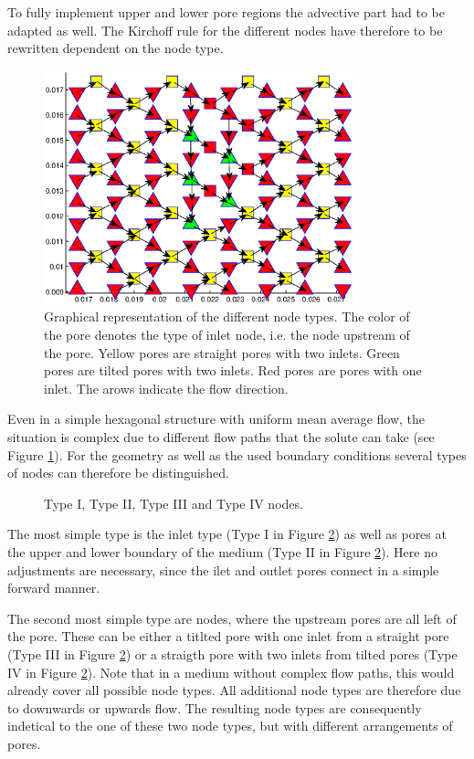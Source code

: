 \documentclass[12pt]{report}
\newcommand*{\PsTricksPath}{pstricks}
\begin{document}
To fully implement upper and lower pore regions the advective part had to be adapted as well. The Kirchoff rule for the different nodes have therefore to be rewritten dependent on the node type.

\begin{figure}[ht]
	\centering
	\includegraphics[width=0.8\textwidth]{node_types_02}
	\caption[]{Graphical representation of the different node types. The color of the pore denotes the type of inlet node, i.e. the node upstream of the pore. Yellow pores are straight pores with two inlets. Green pores are tilted pores with two inlets. Red pores are pores with one inlet. The arows indicate the flow direction.} 
	\label{fig:node_types}
\end{figure}

Even in a simple hexagonal structure with uniform mean average flow, the situation is complex due to different flow paths that the solute can take (see Figure \ref{fig:node_types}). For the geometry as well as the used boundary conditions several types of nodes can therefore be distinguished. 

\begin{figure}[ht]
	\subfigure
	{} \hfill
	\subfigure
	{}
	\caption{Type I, Type II, Type III and Type IV nodes.}
	\label{fig:node_type_01}
\end{figure}

The most simple type is the inlet type (Type I in Figure \ref{fig:node_type_01}) as well as pores at the upper and lower boundary of the medium (Type II in Figure \ref{fig:node_type_01}). Here no adjustments are necessary, since the ilet and outlet pores connect in a simple forward manner.

The second most simple type are nodes, where the upstream pores are all left of the pore. These can be either a titlted pore with one inlet from a straight pore (Type III in Figure \ref{fig:node_type_01}) or a straigth pore with two inlets from tilted pores (Type IV in Figure \ref{fig:node_type_01}). Note that in a medium without complex flow paths, this would already cover all possible node types. All additional node types are therefore due to downwards or upwards flow. The resulting node types are consequently indetical to the one of these two node types, but with different arrangements of pores.
\end{document}

